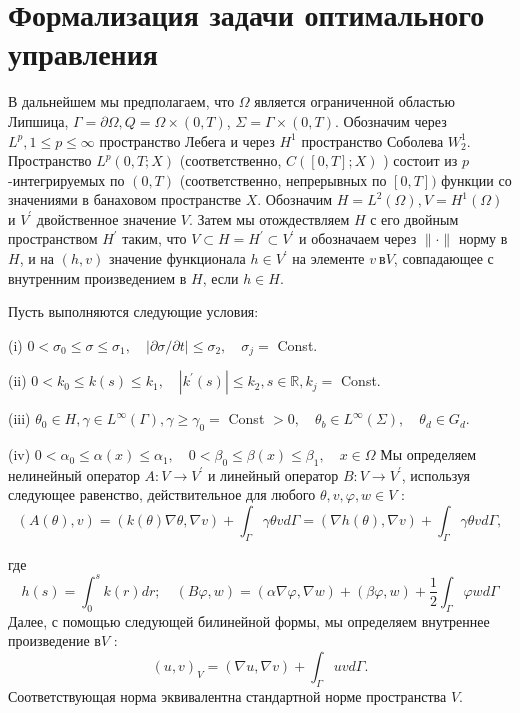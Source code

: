 \documentclass[10pt]{article}
\begin{document}
    \section{Формализация задачи оптимального управления}

    В дальнейшем мы предполагаем, что $\Omega $ является ограниченной областью Липшица,
    $\Gamma =\partial \Omega, Q =\Omega \times(0, T)$, $\Sigma=\Gamma \times(0, T)$.
    Обозначим через $L ^ {p}, 1 \leq p \leq \infty$ пространство Лебега и через $H^{1}$
    пространство Соболева $W_{2}^{1}$.
    Пространство $L ^ {p}(0, T ; X)$ (соответственно, $C([0, T] ; X)$ ) состоит из
    $p$-интегрируемых по $(0, T)$ (соответственно, непрерывных по $[0, T])$ функции со значениями
    в банаховом пространстве $X$.
    Обозначим $H=L ^{2}(\Omega), V=H^{1} (\Omega)$ и $V ^ {\prime}$ двойственное значение $V$.
    Затем мы отождествляем $H $ с его двойным пространством $H ^ {\prime}$ таким,
    что $V \subset H = H ^ {\prime} \subset V ^ {\prime}$ и обозначаем
    через $ \|\cdot \|$ норму в $H$, и на $(h, v)$ значение функционала $h \in V ^ {\prime}$
    на элементе $v \ в V$, совпадающее с внутренним произведением в $H$, если $h \in H$.


    Пусть выполняются следующие условия:

    (i) $0<\sigma_{0} \leq \sigma \leq \sigma_{1}, \quad|\partial \sigma / \partial t| \leq \sigma_{2}, \quad \sigma_{j}=$ Const.

    (ii) $0<k_{0} \leq k(s) \leq k_{1}, \quad\left|k^{\prime}(s)\right| \leq k_{2}, s \in \mathbb{R}, k_{j}=$ Const.

    (iii) $\theta_{0} \in H, \gamma \in L^{\infty}(\Gamma), \gamma \geq \gamma_{0}=$ Const $>0, \quad \theta_{b} \in L^{\infty}(\Sigma), \quad \theta_{d} \in G_{d}$.

    (iv) $0<\alpha_{0} \leq \alpha(x) \leq \alpha_{1}, \quad 0<\beta_{0} \leq \beta(x) \leq \beta_{1}, \quad x \in \Omega$
    Мы определяем нелинейный оператор $A:V\rightarrow V^{\prime}$
    и линейный оператор $B:V\rightarrow V ^ {\prime}$,
    используя следующее равенство, действительное для любого $\theta, v, \varphi, w \in V$ :
    \[
        (A(\theta), v)=(k(\theta) \nabla \theta, \nabla v)+\int_{\Gamma} \gamma \theta v d
        \Gamma=(\nabla h(\theta), \nabla v)+\int_{\Gamma} \gamma \theta v d \Gamma,
    \]

    где%
    \[
        h(s)=\int_{0}^{s} k(r) d r ; \quad(B \varphi, w)=
        (\alpha \nabla \varphi, \nabla w)+(\beta \varphi, w)+\frac{1}{2} \int_{\Gamma} \varphi w d \Gamma
    \]
    Далее, с помощью следующей билинейной формы, мы определяем внутреннее произведение в$V$ :
    \[
        (u, v)_{V}=(\nabla u, \nabla v)+\int_{\Gamma} u v d \Gamma.
    \]
    Соответствующая норма эквивалентна стандартной норме пространства $V$.
\end{document}
